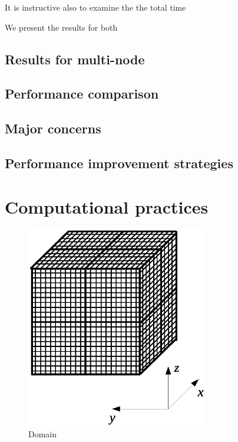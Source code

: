 \documentclass{article}
\begin{document}
    It is instructive also to examine the the total time


    We present the results for both

    \subsection{Results for multi-node}



    \subsection{Performance comparison}

    \subsection{Major concerns}

    \subsection{Performance improvement strategies}

\section{Computational practices}

\begin{figure}[h]
\begin{center}
\includegraphics[trim={{100pt} {150pt} {100pt} {150pt}}, clip, height=250pt]{img/domain.eps}
\end{center}
\caption{Domain}
\label{fig:domain}
\end{figure}
\end{document}

